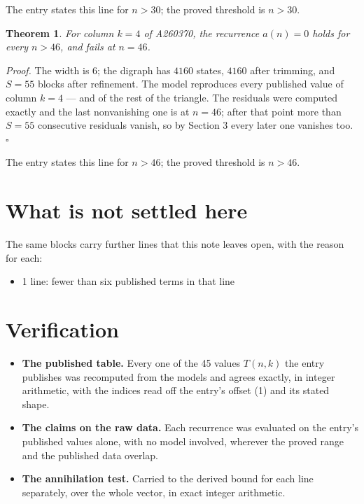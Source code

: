 \documentclass[11pt]{article}
\newtheorem{theorem}{Theorem}
\theoremstyle{definition}
\begin{document}
The entry states this line for $n > 30$; the proved threshold is $n > 30$.

\begin{theorem} For column $k = 4$ of A260370, the recurrence $a(n) = 0$ holds for every $n > 46$, and fails at $n = 46$.\end{theorem}

{\itshape Proof.} The width is $6$; the digraph has $4160$ states, $4160$ after trimming, and $S = 55$ blocks after refinement. The model reproduces every published value of column $k = 4$ --- and of the rest of the triangle. The residuals were computed exactly and the last nonvanishing one is at $n = 46$; after that point more than $S = 55$ consecutive residuals vanish, so by Section 3 every later one vanishes too. $\square$

The entry states this line for $n > 46$; the proved threshold is $n > 46$.

\section{What is not settled here}

The same blocks carry further lines that this note leaves open, with the reason for each:

\begin{itemize}

\item 1 line: fewer than six published terms in that line

\end{itemize}

\section{Verification}

\begin{itemize}

\item {\bfseries The published table.} Every one of the 45 values $T(n,k)$ the entry publishes was recomputed from the models and agrees exactly, in integer arithmetic, with the indices read off the entry's offset (1) and its stated shape.

\item {\bfseries The claims on the raw data.} Each recurrence was evaluated on the entry's published values alone, with no model involved, wherever the proved range and the published data overlap.

\item {\bfseries The annihilation test.} Carried to the derived bound for each line separately, over the whole vector, in exact integer arithmetic.

\end{itemize}
\end{document}
